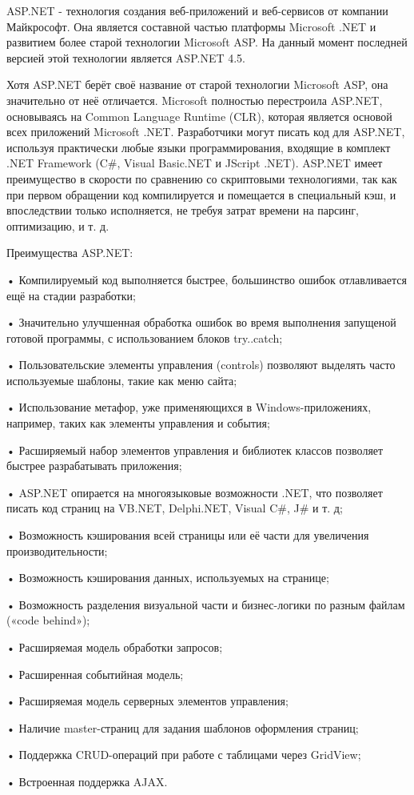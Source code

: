 \documentclass[14pt,a4paper]{extreport}
\begin{document}
	\parindent=1cm ASP.NET  - технология создания веб-приложений и веб-сервисов от компании Майкрософт. Она является составной частью платформы Microsoft .NET и развитием более старой технологии Microsoft ASP. На данный момент последней версией этой технологии является ASP.NET 4.5.\par
 	Хотя ASP.NET берёт своё название от старой технологии Microsoft ASP, она значительно от неё отличается. Microsoft полностью перестроила ASP.NET, основываясь на Common Language Runtime (CLR), которая является основой всех приложений Microsoft .NET. Разработчики могут писать код для ASP.NET, используя практически любые языки программирования, входящие в комплект .NET Framework (C\#, Visual Basic.NET и JScript .NET). ASP.NET имеет преимущество в скорости по сравнению со скриптовыми технологиями, так как при первом обращении код компилируется и помещается в специальный кэш, и впоследствии только исполняется, не требуя затрат времени на парсинг, оптимизацию, и т. д.\par
	Преимущества ASP.NET:\par
	• Компилируемый код выполняется быстрее, большинство ошибок отлавливается ещё на стадии разработки;\par
	• Значительно улучшенная обработка ошибок во время выполнения запущеной готовой программы, с использованием блоков try..catch;\par
	• Пользовательские элементы управления (controls) позволяют
выделять часто используемые шаблоны, такие как меню сайта;\par
	• Использование метафор, уже применяющихся в Windows-приложениях, например, таких как элементы управления и события;\par
	• Расширяемый набор элементов управления и библиотек классов позволяет быстрее разрабатывать приложения;\par
	• ASP.NET опирается на многоязыковые возможности .NET, что позволяет писать код страниц на VB.NET, Delphi.NET, Visual C\#, J\# и т. д;\par
	• Возможность кэширования всей страницы или её части для увеличения производительности;\par
	• Возможность кэширования данных, используемых на странице;\par
	• Возможность разделения визуальной части и бизнес-логики по разным файлам («code behind»);\par
	• Расширяемая модель обработки запросов;\par
	• Расширенная событийная модель;\par
	• Расширяемая модель серверных элементов управления;\par
	• Наличие master-страниц для задания шаблонов оформления страниц;\par
	• Поддержка CRUD-операций при работе с таблицами через GridView;\par
	• Встроенная поддержка AJAX.\par
\end{document}
